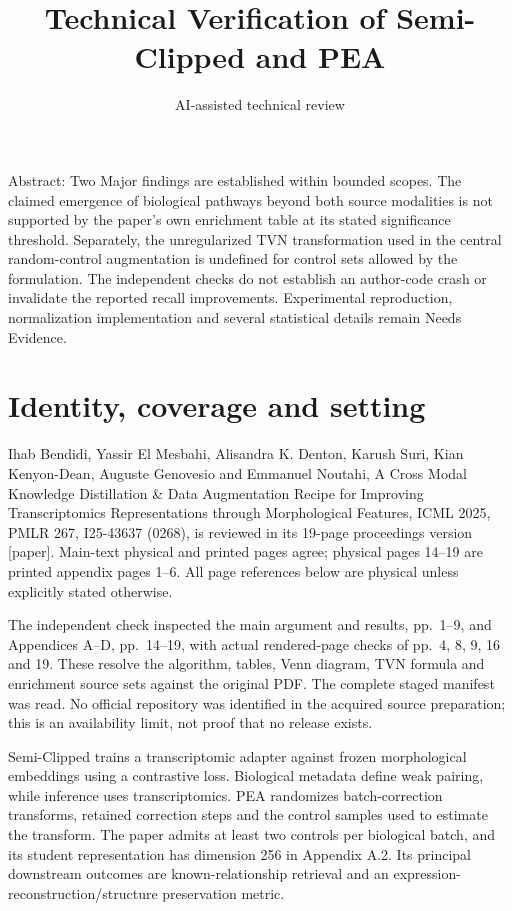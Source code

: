 \documentclass[10pt]{article}
\title{Technical Verification of Semi-Clipped and PEA}
\author{AI-assisted technical review}
\date{}
\begin{document}
\maketitle
Abstract: Two Major findings are established within bounded scopes. The claimed emergence of biological pathways beyond both source modalities is not supported by the paper’s own enrichment table at its stated significance threshold. Separately, the unregularized TVN transformation used in the central random-control augmentation is undefined for control sets allowed by the formulation. The independent checks do not establish an author-code crash or invalidate the reported recall improvements. Experimental reproduction, normalization implementation and several statistical details remain Needs Evidence.\par
\section*{Identity, coverage and setting}
Ihab Bendidi, Yassir El Mesbahi, Alisandra K. Denton, Karush Suri, Kian Kenyon-Dean, Auguste Genovesio and Emmanuel Noutahi, A Cross Modal Knowledge Distillation \& Data Augmentation Recipe for Improving Transcriptomics Representations through Morphological Features, ICML 2025, PMLR 267, I25-43637 (0268), is reviewed in its 19-page proceedings version [paper]. Main-text physical and printed pages agree; physical pages 14–19 are printed appendix pages 1–6. All page references below are physical unless explicitly stated otherwise.\par
The independent check inspected the main argument and results, pp. 1–9, and Appendices A–D, pp. 14–19, with actual rendered-page checks of pp. 4, 8, 9, 16 and 19. These resolve the algorithm, tables, Venn diagram, TVN formula and enrichment source sets against the original PDF. The complete staged manifest was read. No official repository was identified in the acquired source preparation; this is an availability limit, not proof that no release exists.\par
Semi-Clipped trains a transcriptomic adapter against frozen morphological embeddings using a contrastive loss. Biological metadata define weak pairing, while inference uses transcriptomics. PEA randomizes batch-correction transforms, retained correction steps and the control samples used to estimate the transform. The paper admits at least two controls per biological batch, and its student representation has dimension 256 in Appendix A.2. Its principal downstream outcomes are known-relationship retrieval and an expression-reconstruction/structure preservation metric.\par
\end{document}
